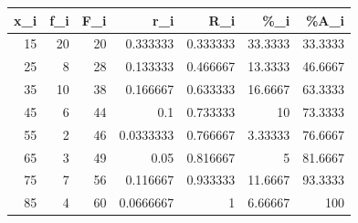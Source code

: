 \documentclass[spanish, 11pt]{exam}
\begin{document}
\begin{questions}
\begin{multicols}{1}
\begin{parts}
\begin{solution}
\begin{tabular}{rrrrrrr}
\hline
   x\_i &   f\_i &   F\_i &       r\_i &      R\_i &      \%\_i &     \%A\_i \\
\hline
    15 &    20 &    20 & 0.333333  & 0.333333 & 33.3333  &  33.3333 \\
    25 &     8 &    28 & 0.133333  & 0.466667 & 13.3333  &  46.6667 \\
    35 &    10 &    38 & 0.166667  & 0.633333 & 16.6667  &  63.3333 \\
    45 &     6 &    44 & 0.1       & 0.733333 & 10       &  73.3333 \\
    55 &     2 &    46 & 0.0333333 & 0.766667 &  3.33333 &  76.6667 \\
    65 &     3 &    49 & 0.05      & 0.816667 &  5       &  81.6667 \\
    75 &     7 &    56 & 0.116667  & 0.933333 & 11.6667  &  93.3333 \\
    85 &     4 &    60 & 0.0666667 & 1        &  6.66667 & 100      \\
\hline

\end{tabular}
\end{solution}
\end{parts}
\end{multicols}
\end{questions}
\end{document}
